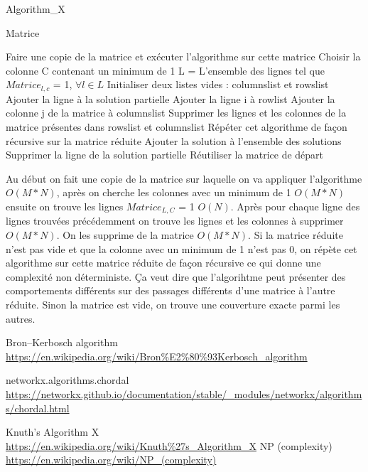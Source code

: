 \documentclass{article}
\begin{document}
		\begin{algorithm}[H]
		\caption{Algorithm\_X}
		\begin{algorithmic}[1]
		\REQUIRE Matrice
		
		\STATE Faire une copie de la matrice et exécuter l'algorithme sur cette matrice		
		\STATE Choisir la colonne C contenant un minimum de 1
		\STATE L = L'ensemble des lignes tel que $Matrice_{l,c}$ = 1, $\forall l \in L$
			\STATE Initialiser deux listes vides : columnslist et rowslist
			\STATE Ajouter la ligne à la solution partielle
							\STATE Ajouter la ligne i à rowlist
						\ENDIF									
					\ENDFOR
					\STATE Ajouter la colonne j de la matrice à columnslist	
				\ENDIF
			\ENDFOR
		\STATE Supprimer les lignes et les colonnes de la matrice présentes dans rowslist et columnslist
				\STATE Répéter cet algorithme de façon récursive sur la matrice réduite
			\ENDIF			
		\ELSE
			\STATE Ajouter la solution à l'ensemble des solutions
		\ENDIF 
		\STATE Supprimer la ligne de la solution partielle
		\STATE Réutiliser la matrice de départ
		\ENDFOR
	
		\end{algorithmic}
		\end{algorithm}
		
\cite{Algo3}
Au début on fait une copie de la matrice sur laquelle on va appliquer l'algorithme $O(M*N)$, après on cherche les colonnes avec un minimum de 1 $O(M*N)$ ensuite on trouve les lignes $Matrice_{L,C}$ = 1 $O(N)$. Après pour chaque ligne des lignes trouvées précédemment on trouve les lignes et les colonnes à supprimer $O(M*N)$. On les supprime de la matrice $O(M*N)$. Si la matrice réduite n'est pas vide et que la colonne avec un minimum de 1 n'est pas 0, on répète cet algorithme sur cette matrice réduite de façon récursive ce qui donne une complexité non déterministe. Ça veut dire que l'algorihtme peut présenter des comportements différents sur des passages différents d'une matrice à l'autre réduite. Sinon la matrice est vide, on trouve une couverture exacte parmi les autres.


\begin{thebibliography}{9}

Bron–Kerbosch algorithm
\\\url{https://en.wikipedia.org/wiki/Bron%E2%80%93Kerbosch_algorithm}

networkx.algorithms.chordal
\\\url{https://networkx.github.io/documentation/stable/_modules/networkx/algorithms/chordal.html}

Knuth's Algorithm X
\\\url{https://en.wikipedia.org/wiki/Knuth%27s_Algorithm_X}
NP (complexity)
\\\url{https://en.wikipedia.org/wiki/NP_(complexity)}

\end{thebibliography}
		
\end{document}
